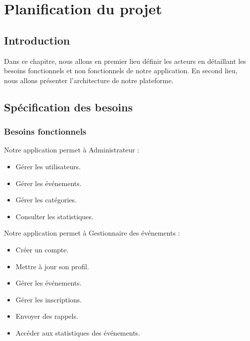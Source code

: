 \chapter{Planification du projet}

 


\section*{Introduction}
Dans ce chapitre, nous allons en premier lieu définir les acteurs en détaillant les besoins fonctionnels et non fonctionnels de notre application. En second lieu, nous allons présenter l’architecture de notre plateforme.

\renewcommand{\thesection}{\Roman{section}.} 
\renewcommand{\thesubsection}{\arabic{subsection}.}
\renewcommand{\thesubsubsection}{\thesubsection\arabic{subsubsection}}

\section{Spécification des besoins}


\subsection{Besoins fonctionnels}
Notre application permet à Administrateur :
\begin{itemize}
    \item Gérer les utilisateurs.
    \item Gérer les événements.
    \item Gérer les catégories.
    \item Consulter les statistiques.
\end{itemize}

Notre application permet à Gestionnaire des événements :
\begin{itemize}
    \item Créer un compte.
    \item Mettre à jour son profil.
    \item Gérer les événements.
    \item Gérer les inscriptions.
    \item Envoyer des rappels.
    \item Accéder aux statistiques des événements.
\end{itemize}

